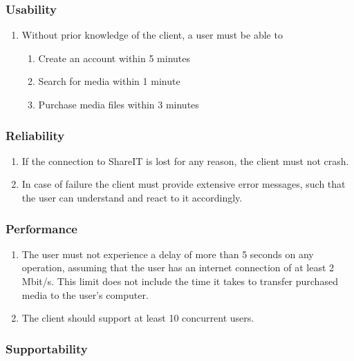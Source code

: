 %

\subsubsection{Usability}

\begin{enumerate}[label=\textbf{NFR-\twodigits*}]
\item Without prior knowledge of the client, a user must be able to
	\begin{enumerate}
	\item{Create an account within 5 minutes}
	\item Search for media within 1 minute
	\item Purchase media files within 3 minutes
	\end{enumerate}
\end{enumerate}

\subsubsection{Reliability}

\begin{enumerate}[label=\textbf{NFR-\twodigits*}, resume]
\item If the connection to ShareIT is lost for any reason, the client must not crash. 
\item In case of failure the client must provide extensive error messages, such that the user can understand and react to it accordingly.
\end{enumerate}

\subsubsection{Performance}

\begin{enumerate}[label=\textbf{NFR-\twodigits*}, resume]
\item The user must not experience a delay of more than 5 seconds on any operation, assuming that the user has an internet connection of at least 2 Mbit/s. This limit does not include the time it takes to transfer purchased media to the user's computer.
\item The client should support at least 10 concurrent users. 
\end{enumerate}

\subsubsection{Supportability}

